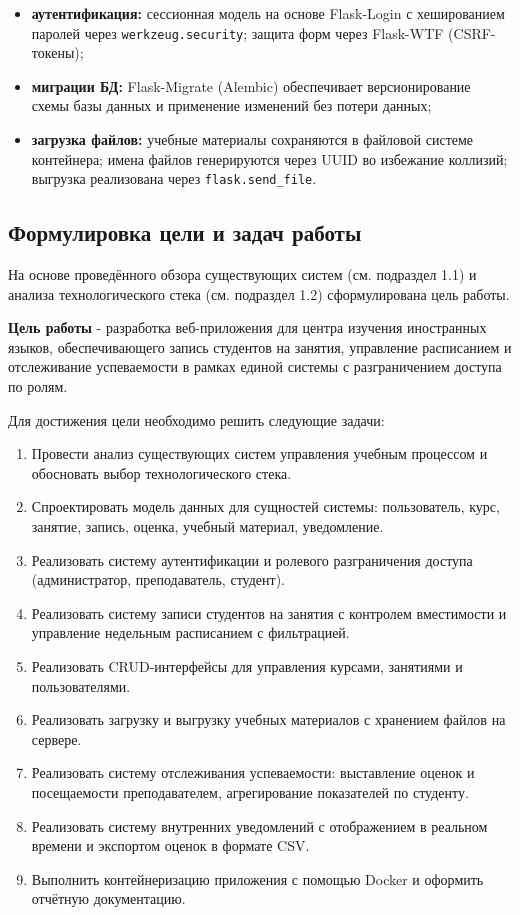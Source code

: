 \begin{itemize}
    \item \textbf{аутентификация:} сессионная модель на основе Flask-Login с
          хешированием паролей через \texttt{werkzeug.security}; защита форм
          через Flask-WTF (CSRF-токены);
    \item \textbf{миграции БД:} Flask-Migrate (Alembic) обеспечивает
          версионирование схемы базы данных и применение изменений без потери данных;
    \item \textbf{загрузка файлов:} учебные материалы сохраняются в файловой
          системе контейнера; имена файлов генерируются через UUID во избежание
          коллизий; выгрузка реализована через \texttt{flask.send\_file}.
\end{itemize}

\subsection{Формулировка цели и задач работы}

На основе проведённого обзора существующих систем (см. подраздел 1.1) и
анализа технологического стека (см. подраздел 1.2) сформулирована цель работы.

\textbf{Цель работы} - разработка веб-приложения для центра изучения иностранных
языков, обеспечивающего запись студентов на занятия, управление расписанием
и отслеживание успеваемости в рамках единой системы с разграничением доступа
по ролям.

Для достижения цели необходимо решить следующие задачи:
\begin{enumerate}
    \item Провести анализ существующих систем управления учебным процессом и
          обосновать выбор технологического стека.
    \item Спроектировать модель данных для сущностей системы: пользователь,
          курс, занятие, запись, оценка, учебный материал, уведомление.
    \item Реализовать систему аутентификации и ролевого разграничения доступа
          (администратор, преподаватель, студент).
    \item Реализовать систему записи студентов на занятия с контролем вместимости
          и управление недельным расписанием с фильтрацией.
    \item Реализовать CRUD-интерфейсы для управления курсами, занятиями
          и пользователями.
    \item Реализовать загрузку и выгрузку учебных материалов с хранением
          файлов на сервере.
    \item Реализовать систему отслеживания успеваемости: выставление оценок
          и посещаемости преподавателем, агрегирование показателей по студенту.
    \item Реализовать систему внутренних уведомлений с отображением в реальном
          времени и экспортом оценок в формате CSV.
    \item Выполнить контейнеризацию приложения с помощью Docker и оформить
          отчётную документацию.
\end{enumerate}

